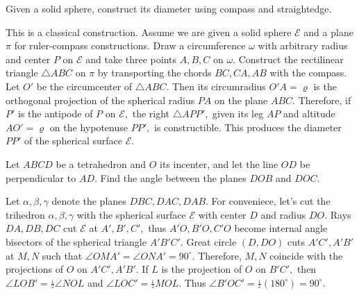 \begin{question}[name={Toronto Junior Math Battle}]
	Given a solid sphere, construct its diameter using compass and straightedge.
\end{question}





\begin{solution}[name={Solution by Luis González}] 
	This is a classical construction. Assume we are given a solid sphere $ \mathcal{E}$ and a plane $ \pi$ for ruler-compass constructions. Draw a circumference $ \omega$ with arbitrary radius and center $ P$ on $ \mathcal{E}$ and take three points $ A,B,C$ on $ \omega.$ Construct the rectilinear triangle $ \triangle ABC$ on $ \pi$ by transporting the chords $ BC,CA,AB$ with the compass. Let $ O'$ be the circumcenter of $ \triangle ABC.$ Then its circumradius $ O'A = \varrho$ is the orthogonal projection of the spherical radius $ PA$ on the plane $ ABC.$ Therefore, if $ P'$ is the antipode of $ P$ on $ \mathcal{E},$ the right $ \triangle APP',$ given its leg $ AP$ and altitude $ AO' = \varrho$ on the hypotenuse $ PP',$ is constructible. This produces the diameter $ PP'$ of the spherical surface $ \mathcal{E}.$
\end{solution}





\begin{question}
	Let $ABCD$ be a tetrahedron and $O$ its incenter, and let the line $OD$ be perpendicular to $AD$. Find the angle between the planes $DOB$ and $DOC.$
\end{question}





\begin{solution}[name={Solution by Luis González}] 
	Let $\alpha,\beta,\gamma$ denote the planes $DBC,DAC,DAB.$ For conveniece, let's cut the trihedron $\alpha,\beta,\gamma$ with the spherical surface $\mathcal{E}$ with center $D$ and radius $DO.$ Rays $DA,DB,DC$ cut $\mathcal{E}$ at $A',B',C',$ thus $A'O,B'O,C'O$ become internal angle bisectors of the spherical triangle $A'B'C'.$ Great circle $(D,DO)$ cuts $A'C',A'B'$ at $M,N$ such that $\angle OMA'=\angle ONA'=90^{\circ}$. Therefore, $M,N$ coincide with the projections of $O$ on $A'C',A'B'.$ If $L$ is the projection of $O$ on $B'C',$ then $\angle LOB'=\frac{_1}{^2}\angle NOL$ and $\angle LOC'=\frac{_1}{^2}MOL.$ Thus $\angle B'OC'=\frac{_1}{^2}(180^{\circ})=90^{\circ}.$
\end{solution}







